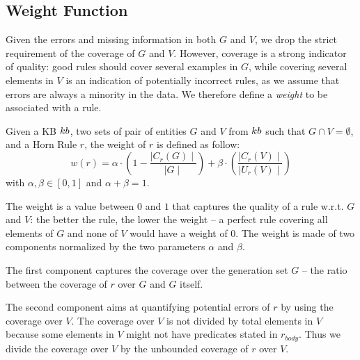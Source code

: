 \subsection{Weight Function} \label{sec:krd_weight_fun}
Given the errors and missing information in both $G$ and $V$, we drop the strict requirement of the coverage of $G$ and $V$. However, coverage is a strong indicator of quality: good rules should cover several examples in $G$, while covering several elements in $V$ is an indication of potentially incorrect rules, as we assume that errors are always a minority in the data. 
We therefore define a \emph{weight} to be associated with a rule. %


\begin{definition}
	Given a KB ${\sc kb}$, two sets of pair of entities $G$ and $V$ from ${\sc kb}$ such that $G \cap V = \emptyset$, and a Horn Rule $r$, the weight of $r$ is defined as follow:
	\begin{equation} \label{eq:weight_fun}
		w(r) = \alpha \cdot (1-\frac{\mid C_{r}(G)\mid}{\mid G \mid}) +\beta \cdot (\frac{\mid C_{r}(V) \mid}{\mid U_{r}(V)\mid})
	\end{equation}
	with $\alpha,\beta \in [0,1]$ and $\alpha + \beta = 1$. 
\end{definition}

The weight is a value between $0$ and $1$ that captures the quality of a rule w.r.t. $G$ and $V$: the better the rule, the lower the weight -- a perfect rule covering all elements of $G$ and none of $V$ would have a weight of $0$.
%
The weight is made of two components normalized by the two parameters $\alpha$ and $\beta$.
%
\begin{inparaenum}[\itshape1)]
	\item The first component captures the coverage over the generation set $G$ -- the ratio between the coverage of $r$ over $G$ and $G$ itself. 
	\item The second component aims at quantifying potential errors of $r$ by using the coverage over $V$. The coverage over $V$ is not divided by total elements in $V$ because some elements in $V$ might not have predicates stated in $r_{body}$.
	Thus we divide the coverage over $V$ by the unbounded coverage of $r$ over $V$. 
\end{inparaenum}


